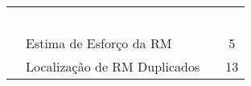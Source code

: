 \begin{table}[htbp]
{\begin{tabular}{|c|l|l|c|}
                              &                                                  & \cite{Nagwani2013}                             &                      \\
                              &                                                  & \cite{netto2010automated}                      &                      \\
                              &                                                  & \cite{somasundaram2012automatic}               &                      \\
                              &                                                  & \cite{Tian:2013:DPP:2550526.2550574}           &                      \\
                              &                                                  & \cite{zhang2011bug}                            &                      \\ \cline{2-4} 
                              & \multirow{5}{*}{Estima de Esforço da RM}         & \cite{Bhattacharya:2011:BTP:1985441.1985472}   & \multirow{5}{*}{5}   \\
                              &                                                  & \cite{Nagwani2010}                             &                      \\
                              &                                                  & \cite{Thung2012}                               &                      \\
                              &                                                  & \cite{Vijayakumar2014}                         &                      \\
                              &                                                  & \cite{xia2015automatic}                        &                      \\ \cline{2-4} 
                              & \multirow{13}{*}{Localização de RM Duplicados}   & \cite{alipour2013contextual}                   & \multirow{13}{*}{13} \\
                              &                                                  & \cite{banerjee2012automated}                   &                      \\
                              &                                                  & \cite{hindle2016contextual}                    &                      \\
                              &                                                  & \cite{Koopaei:2015:CAD:2886444.2886474}        &                      \\

\end{tabular}}
\end{table}
